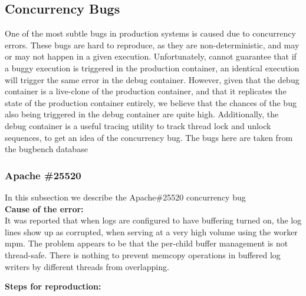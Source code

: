 \subsection{Concurrency Bugs}
One of the most subtle bugs in production systems is caused due to concurrency errors.
These bugs are hard to reproduce, as they are non-deterministic, and may or may not happen in a given execution.
Unfortunately, \parikshan cannot guarantee that if a buggy execution is triggered in the production container, an identical execution will trigger the same error in the debug container.
However, given that the debug container is a live-clone of the production container, and that it replicates the state of the production container entirely, we believe that the chances of the bug also being triggered in the debug container are quite high.
Additionally, the debug container is a useful tracing utility to track thread lock and unlock sequences, to get an idea of the concurrency bug.
The bugs here are taken from the bugbench database~\cite{bugbench}

\subsubsection{Apache \#25520}

In this subsection we describe the Apache\#25520 concurrency bug \\

\noindent \textbf{Cause of the error:} \\

It was reported that when logs are configured to have buffering turned on, the log lines show up as corrupted, when serving at a very high volume using the worker mpm.
The problem appears to be that the per-child buffer management is not thread-safe.
There is nothing to prevent memcopy operations in buffered log writers by different threads from overlapping.
 

\noindent \textbf{Steps for reproduction:} \\


